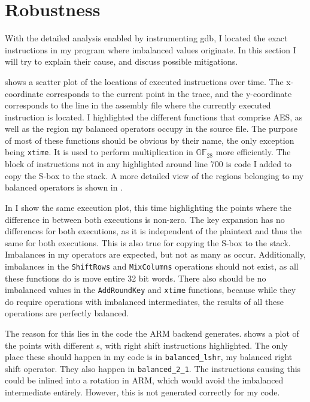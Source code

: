 \section{Robustness}
With the detailed analysis enabled by instrumenting gdb, I located the exact instructions in my program where imbalanced values originate.
In this section I will try to explain their cause, and discuss possible mitigations.

 shows a scatter plot of the locations of executed instructions over time.
The x-coordinate corresponds to the current point in the trace, and the y-coordinate corresponds to the line in the assembly file where the currently executed instruction is located.
I highlighted the different functions that comprise AES, as well as the region my balanced operators occupy in the source file.
The purpose of most of these functions should be obvious by their name, the only exception being \texttt{xtime}.
It is used to perform multiplication in $\mathbb{GF}_{28}$ more efficiently.
The block of instructions not in any highlighted around line 700 is code I added to copy the S-box to the stack.
A more detailed view of the regions belonging to my balanced operators is shown in .

In  I show the same execution plot, this time highlighting the points where the difference in \hammingw{} between both executions is non-zero.
The key expansion has no differences for both executions, as it is independent of the plaintext and thus the same for both executions.
This is also true for copying the S-box to the stack.
Imbalances in my operators are expected, but not as many as occur.
Additionally, imbalances in the \texttt{ShiftRows} and \texttt{MixColumns} operations should not exist, as all these functions do is move entire 32 bit words.
There also should be no imbalanced values in the \texttt{AddRoundKey} and \texttt{xtime} functions, because while they do require operations with imbalanced intermediates, the results of all these operations are perfectly balanced.

The reason for this lies in the code the ARM backend generates.
 shows a plot of the points with different \hammingw{}s, with right shift instructions highlighted.
The only place these should happen in my code is in \texttt{balanced\_lshr}, my balanced right shift operator.
They also happen in \texttt{balanced\_2\_1}.
The instructions causing this could be inlined into a rotation in ARM, which would avoid the imbalanced intermediate entirely.
However, this is not generated correctly for my code.

